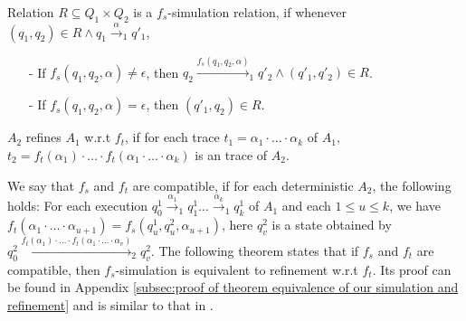 
\begin{definition}[$f_s$-Simulation]
\label{definition:fs simulation}
Relation $R \subseteq Q_1 \times Q_2$ is a $f_s$-simulation relation, if whenever $(q_1,q_2) \in R \wedge q_1 {\xrightarrow{\alpha}}_1 q'_1$,
\begin{itemize}
\setlength{\itemsep}{0.5pt}
\item[-] If $f_s(q_1,q_2,\alpha) \neq \epsilon$, then $q_2 {\xrightarrow{f_s(q_1,q_2,\alpha)}}_1 q'_2 \wedge (q'_1,q'_2) \in R$.

\item[-] If $f_s(q_1,q_2,\alpha) = \epsilon$, then $(q'_1,q_2) \in R$.
\end{itemize}
\end{definition}


\begin{definition}[refinement w.r.t $f_t$]
\label{definition:ft refinement}
$A_2$ refines $A_1$ w.r.t $f_t$, if for each trace $t_1 = \alpha_1 \cdot \ldots \cdot \alpha_k$ of $A_1$, $t_2 = f_t(\alpha_1) \cdot \ldots \cdot f_t(\alpha_1 \cdot \ldots \cdot \alpha_k)$ is an trace of $A_2$.
\end{definition}



We say that $f_s$ and $f_t$ are compatible, if for each deterministic $A_2$, the following holds: For each execution %
$q_{0}^1 {\xrightarrow{\alpha_1}}_1 q_{1}^1 \ldots {\xrightarrow{\alpha_k}}_1 q_{k}^1$ of $A_1$ and each $1 \leq u \leq k$, we have $f_t(\alpha_1 \cdot \ldots \cdot \alpha_{u+1}) = f_s(q_{u}^1,q_{u}^2,\alpha_{u+1})$, here $q_v^2$ is a state obtained by $q_{0}^2 {\xrightarrow{f_t(\alpha_1) \cdot \ldots \cdot f_t(\alpha_1 \cdot \ldots \cdot \alpha_v) }}_2 q_v^2$. %
The following theorem states that if $f_s$ and $f_t$ are compatible, then $f_s$-simulation is equivalent to refinement w.r.t $f_t$. Its proof can be found in Appendix \ref{subsec:proof of theorem equivalence of our simulation and refinement} and is similar to that in \cite{Abadi:1991,Lynch:1995}.

